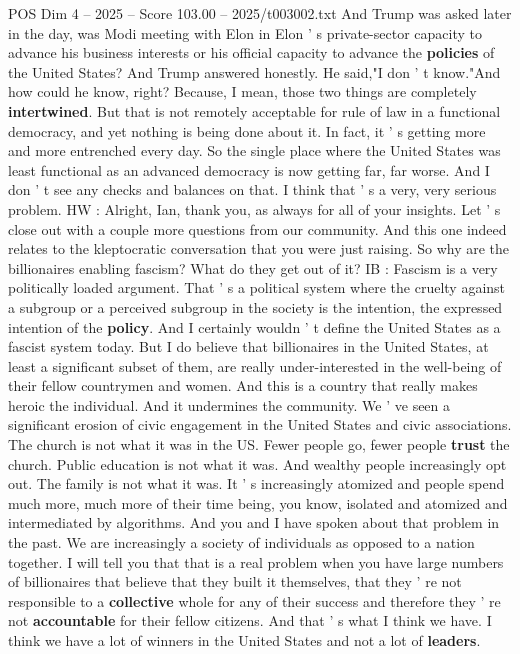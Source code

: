 \begin{textsample}{POS Dim 4 – 2025 – Score 103.00 – 2025/t003002.txt}
And Trump was asked later in the day, was Modi meeting with Elon in Elon ' s private-sector capacity to advance his business interests or his official capacity to advance the \textbf{policies} of the United States?
And Trump answered honestly.
He said,"I don ' t know."And how could he know, right?
Because, I mean, those two things are completely \textbf{intertwined}.
But that is not remotely acceptable for rule of law in a functional democracy, and yet nothing is being done about it.
In fact, it ' s getting more and more entrenched every day.
So the single place where the United States was least functional as an advanced democracy is now getting far, far worse.
And I don ' t see any checks and balances on that.
I think that ' s a very, very serious problem.
HW : Alright, Ian, thank you, as always for all of your insights.
Let ' s close out with a couple more questions from our community.
And this one indeed relates to the kleptocratic conversation that you were just raising.
So why are the billionaires enabling fascism?
What do they get out of it?
IB : Fascism is a very politically loaded argument.
That ' s a political system where the cruelty against a subgroup or a perceived subgroup in the society is the intention, the expressed intention of the \textbf{policy}.
And I certainly wouldn ' t define the United States as a fascist system today.
But I do believe that billionaires in the United States, at least a significant subset of them, are really under-interested in the well-being of their fellow countrymen and women.
And this is a country that really makes heroic the individual.
And it undermines the community.
We ' ve seen a significant erosion of civic engagement in the United States and civic associations.
The church is not what it was in the US.
Fewer people go, fewer people \textbf{trust} the church.
Public education is not what it was.
And wealthy people increasingly opt out.
The family is not what it was.
It ' s increasingly atomized and people spend much more, much more of their time being, you know, isolated and atomized and intermediated by algorithms.
And you and I have spoken about that problem in the past.
We are increasingly a society of individuals as opposed to a nation together.
I will tell you that that is a real problem when you have large numbers of billionaires that believe that they built it themselves, that they ' re not responsible to a \textbf{collective} whole for any of their success and therefore they ' re not \textbf{accountable} for their fellow citizens.
And that ' s what I think we have.
I think we have a lot of winners in the United States and not a lot of \textbf{leaders}.

\end{textsample}
